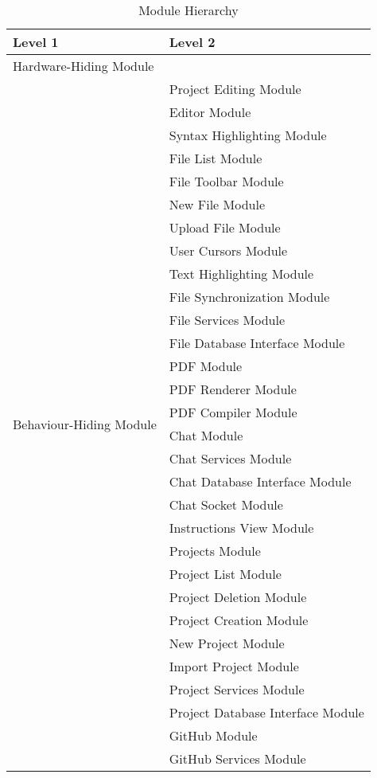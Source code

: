 \documentclass[12pt, titlepage]{article}
\begin{document}
	\begin{table}[H]
		\centering
		\scriptsize\begin{longtable}{p{} p{}}
			\caption{Module Hierarchy} \\
			\toprule
			\textbf{Level 1} & \textbf{Level 2}\\
			\midrule
			
			{Hardware-Hiding Module} & ~ \\
			\midrule
			
			\multirow{37}{0.3\textwidth}{Behaviour-Hiding Module}  & Project Editing Module \\
			& Editor Module \\
			& Syntax Highlighting Module \\
			& File List Module \\
			& File Toolbar Module \\
			& New File Module \\
			& Upload File Module \\
			& User Cursors Module \\
			& Text Highlighting Module \\
			& File Synchronization Module \\
			& File Services Module \\
			& File Database Interface Module \\
			& PDF Module \\
			& PDF Renderer Module \\
			& PDF Compiler Module \\
			& Chat Module \\
			& Chat Services Module \\
			& Chat Database Interface Module \\
			& Chat Socket Module \\
			& Instructions View Module \\
			& Projects Module \\
			& Project List Module \\
			& Project Deletion Module \\
			& Project Creation Module \\
			& New Project Module \\
			& Import Project Module \\
			& Project Services Module \\
			& Project Database Interface Module \\
			& GitHub Module \\
			& GitHub Services Module \\

\end{longtable}
\end{table}
\end{document}
